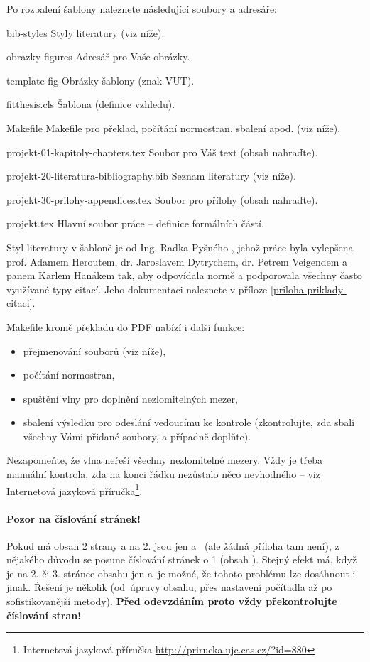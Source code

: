 Po rozbalení šablony naleznete následující soubory a adresáře:
\begin{DESCRIPTION}
  \item [bib-styles] Styly literatury (viz níže). 
  \item [obrazky-figures] Adresář pro Vaše obrázky.
  \item [template-fig] Obrázky šablony (znak VUT).
  \item [fitthesis.cls] Šablona (definice vzhledu).
  \item [Makefile] Makefile pro překlad, počítání normostran, sbalení apod. (viz níže).
  \item [projekt-01-kapitoly-chapters.tex] Soubor pro Váš text (obsah nahraďte).
  \item [projekt-20-literatura-bibliography.bib] Seznam literatury (viz níže).
  \item [projekt-30-prilohy-appendices.tex] Soubor pro přílohy (obsah nahraďte).
  \item [projekt.tex] Hlavní soubor práce -- definice formálních částí.
\end{DESCRIPTION}

Styl literatury v šabloně je od Ing. Radka Pyšného \cite{Pysny}, jehož práce byla vylepšena prof. Adamem Heroutem, dr. Jaroslavem Dytrychem, dr. Petrem Veigendem a panem Karlem Hanákem tak, aby odpovídala normě a podporovala všechny často využívané typy citací. Jeho dokumentaci naleznete v příloze \ref{priloha-priklady-citaci}.

\begin{samepage}
Makefile kromě překladu do PDF nabízí i další funkce:
\begin{itemize}
  \item přejmenování souborů (viz níže),
  \item počítání normostran,
  \item spuštění vlny pro doplnění nezlomitelných mezer,
  \item sbalení výsledku pro odeslání vedoucímu ke kontrole (zkontrolujte, zda sbalí všechny Vámi přidané soubory, a případně doplňte).
\end{itemize}
\end{samepage}

Nezapomeňte, že vlna neřeší všechny nezlomitelné mezery. Vždy je třeba manuální kontrola, zda na konci řádku nezůstalo něco nevhodného -- viz Internetová jazyková příručka\footnote{Internetová jazyková příručka \url{http://prirucka.ujc.cas.cz/?id=880}}.

\paragraph {Pozor na číslování stránek!} Pokud má obsah 2 strany a na 2. jsou jen  a~ (ale žádná příloha tam není), z nějakého důvodu se posune číslování stránek o 1 (obsah ). Stejný efekt má, když je na 2. či 3. stránce obsahu jen  a~je možné, že tohoto problému lze dosáhnout i jinak. Řešení je několik (od~úpravy obsahu, přes nastavení počítadla až po sofistikovanější metody). \textbf{Před odevzdáním proto vždy překontrolujte číslování stran!}


